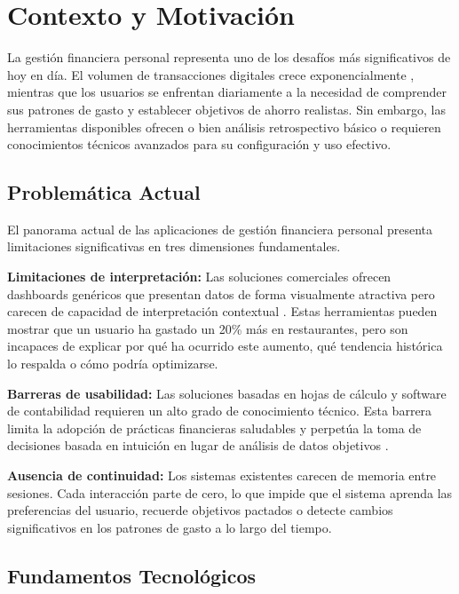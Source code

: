 \section{Contexto y Motivación}
\label{sec:contexto}

La gestión financiera personal representa uno de los desafíos más significativos de hoy en día. El volumen de transacciones digitales crece exponencialmente \cite{fintech2023}, mientras que los usuarios se enfrentan diariamente a la necesidad de comprender sus patrones de gasto y establecer objetivos de ahorro realistas. Sin embargo, las herramientas disponibles ofrecen o bien análisis retrospectivo básico o requieren conocimientos técnicos avanzados para su configuración y uso efectivo.

\subsection{Problemática Actual}
\label{subsec:problematica}

El panorama actual de las aplicaciones de gestión financiera personal presenta limitaciones significativas en tres dimensiones fundamentales.

\textbf{Limitaciones de interpretación:} Las soluciones comerciales ofrecen dashboards genéricos que presentan datos de forma visualmente atractiva pero carecen de capacidad de interpretación contextual \cite{conversational_ai2023}. Estas herramientas pueden mostrar que un usuario ha gastado un 20\% más en restaurantes, pero son incapaces de explicar por qué ha ocurrido este aumento, qué tendencia histórica lo respalda o cómo podría optimizarse.

\textbf{Barreras de usabilidad:} Las soluciones basadas en hojas de cálculo y software de contabilidad requieren un alto grado de conocimiento técnico. Esta barrera limita la adopción de prácticas financieras saludables y perpetúa la toma de decisiones basada en intuición en lugar de análisis de datos objetivos \cite{personal_finance_ai2024}.

\textbf{Ausencia de continuidad:} Los sistemas existentes carecen de memoria entre sesiones. Cada interacción parte de cero, lo que impide que el sistema aprenda las preferencias del usuario, recuerde objetivos pactados o detecte cambios significativos en los patrones de gasto a lo largo del tiempo.

\subsection{Fundamentos Tecnológicos}
\label{subsec:fundamentos}

